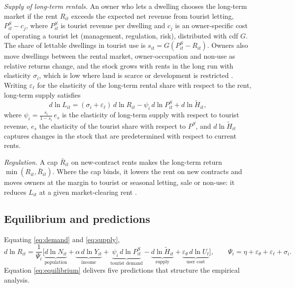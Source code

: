 \textit{Supply of long-term rentals.} An owner who lets a dwelling chooses the long-term market if the rent $R_{it}$ exceeds the expected net revenue from tourist letting, $P^S_{it}-c_j$, where $P^S_{it}$ is tourist revenue per dwelling and $c_j$ is an owner-specific cost of operating a tourist let (management, regulation, risk), distributed with cdf $G$. The share of lettable dwellings in tourist use is $s_{it}=G(P^S_{it}-R_{it})$. Owners also move dwellings between the rental market, owner-occupation and non-use as relative returns change, and the stock grows with rents in the long run with elasticity $\sigma_i$, which is low where land is scarce or development is restricted \citep{saiz2010,glaeser2018,hilber2016}. Writing $\varepsilon_\ell$ for the elasticity of the long-term rental share with respect to the rent, long-term supply satisfies
\begin{equation}\label{eq:supply}
d\ln L_{it}=(\sigma_i+\varepsilon_{\ell})\,d\ln R_{it}-\psi_{i}\,d\ln P^S_{it}+d\ln \tilde H_{it},
\end{equation}
where $\psi_i=\frac{s_i}{1-s_i}\,e_s$ is the elasticity of long-term supply with respect to tourist revenue, $e_s$ the elasticity of the tourist share with respect to $P^S$, and $d\ln\tilde H_{it}$ captures changes in the stock that are predetermined with respect to current rents.

\textit{Regulation.} A cap $\bar R_{it}$ on new-contract rents makes the long-term return $\min(R_{it},\bar R_{it})$. Where the cap binds, it lowers the rent on new contracts and moves owners at the margin to tourist or seasonal letting, sale or non-use: it reduces $L_{it}$ at a given market-clearing rent \citep{autor2014,diamond2019,jofre2023}.

\subsection{Equilibrium and predictions}

Equating \eqref{eq:demand} and \eqref{eq:supply},
\begin{equation}\label{eq:equilibrium}
d\ln R_{it}=\frac{1}{\Psi_i}\Big[\underbrace{d\ln N_{it}}_{\text{population}}+\underbrace{\alpha\,d\ln Y_{it}}_{\text{income}}+\underbrace{\psi_i\,d\ln P^S_{it}}_{\text{tourist demand}}-\underbrace{d\ln\tilde H_{it}}_{\text{supply}}+\underbrace{\varepsilon_\theta\,d\ln U_t}_{\text{user cost}}\Big],\qquad \Psi_i=\eta+\varepsilon_\theta+\varepsilon_\ell+\sigma_i .
\end{equation}
Equation \eqref{eq:equilibrium} delivers five predictions that structure the empirical analysis.

